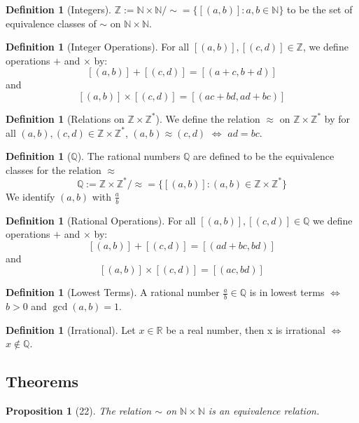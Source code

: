 \documentclass[12pt]{article}
\newtheorem{prop}[thm]{Proposition}
\theoremstyle{definition}
\newtheorem{defn}[thm]{Definition}
\theoremstyle{remark}
\numberwithin{equation}{section}
\newcommand\R{\mathbb R}    %
\newcommand\Z{\mathbb Z}    %
\newcommand\N{\mathbb N}    %
\newcommand\Q{\mathbb Q}    %
\begin{document}
\begin{defn}[Integers]
        $\Z := \N\times\N/\sim = \{[(a,b)]:a,b \in \N\}$ to be the set of equivalence classes of $\sim$ on $\N\times\N$.
\end{defn}


\begin{defn}[Integer Operations]
        For all $[(a,b)],[(c,d)] \in \Z$, we define operations $+$ and $\times$ by: $$[(a,b)]+[(c,d)] = [(a+c,b+d)]$$ and $$[(a,b)]\times[(c,d)] = [(ac+bd,ad+bc)]$$
\end{defn}


\begin{defn}[Relations on $\Z \times \Z^*$]
        We define the relation $\approx$ on $\Z \times \Z^*$ by for all $(a,b),(c,d) \in \Z\times\Z^*$, $(a,b)\approx(c,d)$ $\iff$ $ad = bc$.
\end{defn}



\begin{defn}[$\Q$]
        The rational numbers $\Q$ are defined to be the equivalence classes for the relation $\approx$ $$\Q := \Z\times\Z^*/\approx = \{[(a,b)]:(a,b) \in \Z\times\Z^*\}$$ We identify $(a,b)$ with $\frac{a}{b}$
\end{defn}


\begin{defn}[Rational Operations]
        For all $[(a,b)],[(c,d)]\in \Q$ we define operations $+$ and $\times$ by: $$[(a,b)] + [(c,d)] = [(ad + bc,bd)]$$ and $$[(a,b)]\times[(c,d)] = [(ac,bd)]$$
\end{defn}


\begin{defn}[Lowest Terms]
        A rational number $\frac{a}{b} \in \Q$ is in lowest terms $\iff$ $b > 0$ and $\gcd(a,b) = 1$.
\end{defn}



\begin{defn}[Irrational]
        Let $x \in \R$ be a real number, then x is irrational $\iff$ $x \notin \Q$.
\end{defn}







\subsection{Theorems}


\begin{prop}[22]
        The relation $\sim$ on $\N\times \N$ is an equivalence relation.
\end{prop}
\end{document}
